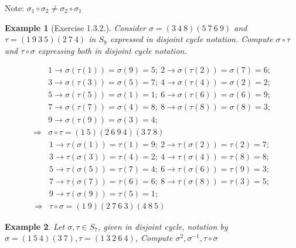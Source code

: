 \documentclass[11pt,a4paper]{article}
\newtheorem{example}{Example}
\begin{document}
Note: $\sigma_1 \circ \sigma_2\neq\sigma_2 \circ \sigma_1$

\begin{example}[Exercise 1.3.2.]
    Consider $\sigma = (3\ 4\ 8)(5\ 7\ 6\ 9)$ and $\tau = (1\ 9\ 3\ 5)(2\ 7\ 4)$ in $S_9$ expressed in disjoint cycle
    notation. Compute $\sigma\circ\tau$ and $\tau\circ\sigma$ expressing both in disjoint cycle notation.
\end{example}

\begin{equation}
    \begin{aligned}
        &1 \rightarrow \sigma(\tau(1))=\sigma(9)=5;\ 
        2 \rightarrow \sigma(\tau(2))=\sigma(7)=6;\\
        &3 \rightarrow \sigma(\tau(3))=\sigma(5)=7;\ 
        4 \rightarrow \sigma(\tau(4))=\sigma(2)=2;\\
        &5 \rightarrow \sigma(\tau(5))=\sigma(1)=1;\ 
        6 \rightarrow \sigma(\tau(6))=\sigma(6)=9;\\
        &7 \rightarrow \sigma(\tau(7))=\sigma(4)=8;\ 
        8 \rightarrow \sigma(\tau(8))=\sigma(8)=3;\\
        &9 \rightarrow \sigma(\tau(9))=\sigma(3)=4;\\
        \Rightarrow	&\sigma\circ\tau=(1\ 5)(2\ 6\ 9\ 4)(3\ 7\ 8)
    \end{aligned}
    \nonumber
\end{equation}
\begin{equation}
    \begin{aligned}
        &1 \rightarrow \tau(\sigma(1))=\tau(1)=9;\ 
        2 \rightarrow \tau(\sigma(2))=\tau(2)=7;\\
        &3 \rightarrow \tau(\sigma(3))=\tau(4)=2;\ 
        4 \rightarrow \tau(\sigma(4))=\tau(8)=8;\\
        &5 \rightarrow \tau(\sigma(5))=\tau(7)=4;\ 
        6 \rightarrow \tau(\sigma(6))=\tau(9)=3;\\
        &7 \rightarrow \tau(\sigma(7))=\tau(6)=6;\ 
        8 \rightarrow \tau(\sigma(8))=\tau(3)=5;\\
        &9 \rightarrow \tau(\sigma(9))=\tau(5)=1;\\
        \Rightarrow	&\tau\circ\sigma=(1\ 9)(2\ 7\ 6\ 3)(4\ 8\ 5)
    \end{aligned}
    \nonumber
\end{equation}
\begin{example}
    Let $\sigma,\tau \in S_7$, given in disjoint cycle,
    notation by
    $\sigma = (1\ 5\ 4)(3\ 7),
    \tau = (1\ 3\ 2\ 6\ 4)$,
    Compute
    $\sigma^2 ,
    \sigma^{-1} ,
    \tau\circ \sigma$
\end{example}
\end{document}
